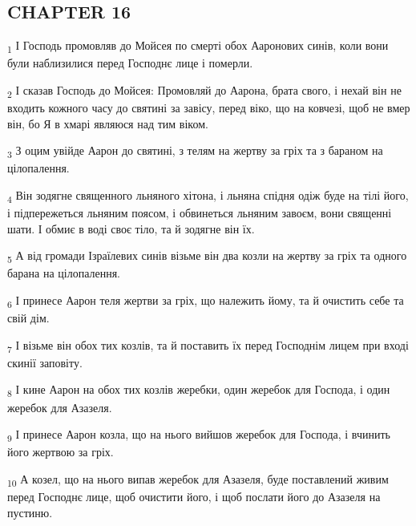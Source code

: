 \subsection{CHAPTER 16}
\begin{tcolorbox}
\textsubscript{1} І Господь промовляв до Мойсея по смерті обох Ааронових синів, коли вони були наблизилися перед Господнє лице і померли.
\end{tcolorbox}
\begin{tcolorbox}
\textsubscript{2} І сказав Господь до Мойсея: Промовляй до Аарона, брата свого, і нехай він не входить кожного часу до святині за завісу, перед віко, що на ковчезі, щоб не вмер він, бо Я в хмарі являюся над тим віком.
\end{tcolorbox}
\begin{tcolorbox}
\textsubscript{3} З оцим увійде Аарон до святині, з телям на жертву за гріх та з бараном на цілопалення.
\end{tcolorbox}
\begin{tcolorbox}
\textsubscript{4} Він зодягне священного льняного хітона, і льняна спідня одіж буде на тілі його, і підпережеться льняним поясом, і обвинеться льняним завоєм, вони священні шати. І обмиє в воді своє тіло, та й зодягне він їх.
\end{tcolorbox}
\begin{tcolorbox}
\textsubscript{5} А від громади Ізраїлевих синів візьме він два козли на жертву за гріх та одного барана на цілопалення.
\end{tcolorbox}
\begin{tcolorbox}
\textsubscript{6} І принесе Аарон теля жертви за гріх, що належить йому, та й очистить себе та свій дім.
\end{tcolorbox}
\begin{tcolorbox}
\textsubscript{7} І візьме він обох тих козлів, та й поставить їх перед Господнім лицем при вході скинії заповіту.
\end{tcolorbox}
\begin{tcolorbox}
\textsubscript{8} І кине Аарон на обох тих козлів жеребки, один жеребок для Господа, і один жеребок для Азазеля.
\end{tcolorbox}
\begin{tcolorbox}
\textsubscript{9} І принесе Аарон козла, що на нього вийшов жеребок для Господа, і вчинить його жертвою за гріх.
\end{tcolorbox}
\begin{tcolorbox}
\textsubscript{10} А козел, що на нього випав жеребок для Азазеля, буде поставлений живим перед Господнє лице, щоб очистити його, і щоб послати його до Азазеля на пустиню.
\end{tcolorbox}
